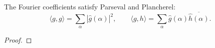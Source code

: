 \begin{theorem}
\label{lem:parseval-plancherel}
\leanok
The Fourier coefficients satisfy Parseval and Plancherel:
  \[
    \langle g,g\rangle = \sum_\alpha |\widehat g(\alpha)|^2,
    \qquad
    \langle g,h\rangle = \sum_\alpha \widehat g(\alpha)\overline{\widehat h(\alpha)}.
  \]
\end{theorem}
\begin{proof}
\end{proof}
